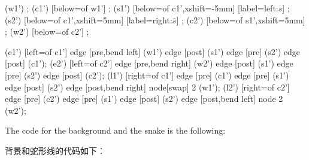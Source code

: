 \ifpgfmanualexternalize\tikzexternaldisable\fi
\begin{codeexample}[
    preamble={\usetikzlibrary{arrows.meta,petri,positioning}},
    pre={\tikzset{
    every place/.style={minimum size=6mm,thick,draw=blue!75,fill=blue!20},
    every transition/.style={thick,draw=black!75,fill=black!20},
    red place/.style=  {place,draw=red!75,fill=red!20},
    every label/.style={red},
    every picture/.style={on grid,node distance=1.3cm,>={Stealth[round]},bend angle=45,auto},
}%
\begin{tikzpicture}},
    post={\end{tikzpicture}},
]
  \begin{scope}[xshift=6cm]
    \node [place,tokens=1]     (w1')                            {};
    \node [place]              (c1') [below=of w1']             {};
              (s1') [below=of c1',xshift=-5mm]
            [label=left:$s$]                                    {};
    \node [red place,tokens=3] (s2') [below=of c1',xshift=5mm]
            [label=right:$\bar s$]                              {};
    \node [place]              (c2') [below=of s1',xshift=5mm]  {};
    \node [place,tokens=1]     (w2') [below=of c2']             {};

    \node [transition] (e1') [left=of c1'] {}
      edge [pre,bend left]                  (w1')
      edge [post]                           (s1')
      edge [pre]                            (s2')
      edge [post]                           (c1');
    \node [transition] (e2') [left=of c2'] {}
      edge [pre,bend right]                 (w2')
      edge [post]                           (s1')
      edge [pre]                            (s2')
      edge [post]                           (c2');
    \node [transition] (l1') [right=of c1'] {}
      edge [pre]                            (c1')
      edge [pre]                            (s1')
      edge [post]                           (s2')
      edge [post,bend right] node[swap] {2} (w1');
    \node [transition] (l2') [right=of c2'] {}
      edge [pre]                            (c2')
      edge [pre]                            (s1')
      edge [post]                           (s2')
      edge [post,bend left]  node {2}       (w2');
  \end{scope}
\end{codeexample}

The code for the background and the snake is the following:

背景和蛇形线的代码如下：

